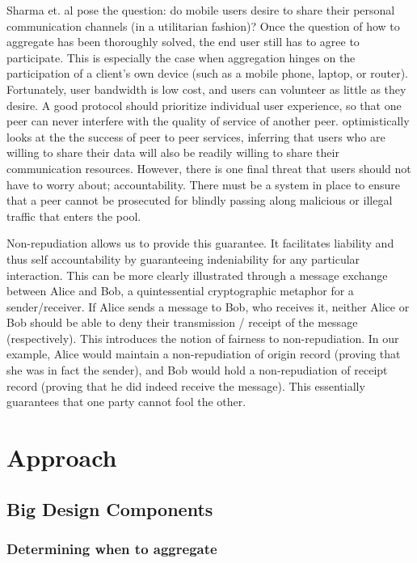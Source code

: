 \documentclass[12pt]{article}
\begin{document}
	Sharma et. al pose the question: do mobile users desire to share their personal communication channels (in a utilitarian fashion)? Once the question of how to aggregate has been thoroughly solved, the end user still has to agree to participate. This is especially the case when aggregation hinges on the participation of a client's own device (such as a mobile phone, laptop, or router). Fortunately, user bandwidth is low cost, and users can volunteer as little as they desire. A good protocol should prioritize individual user experience, so that one peer can never interfere with the quality of service of another peer. \cite{1363842} optimistically looks at the the success of peer to peer services, inferring that users who are willing to share their data will also be readily willing to share their communication resources. However, there is one final threat that users should not have to worry about; accountability. There must be a system in place to ensure that a peer cannot be prosecuted for blindly passing along malicious or illegal traffic that enters the pool.

	Non-repudiation allows us to provide this guarantee. It facilitates liability and thus self accountability by guaranteeing indeniability for any particular interaction. This can be more clearly illustrated through a message exchange between Alice and Bob, a quintessential cryptographic metaphor for a sender/receiver. If Alice sends a message to Bob, who receives it, neither Alice or Bob should be able to deny their transmission / receipt of the message (respectively). This introduces the notion of fairness to non-repudiation. In our example, Alice would maintain a non-repudiation of origin record (proving that she was in fact the sender), and Bob would hold a non-repudiation of receipt record (proving that he did indeed receive the message). This essentially guarantees that one party cannot fool the other\cite{Kremer20021606}.



\section{Approach}

	\subsection{Big Design Components}

		\subsubsection{Determining when to aggregate}
\end{document}
